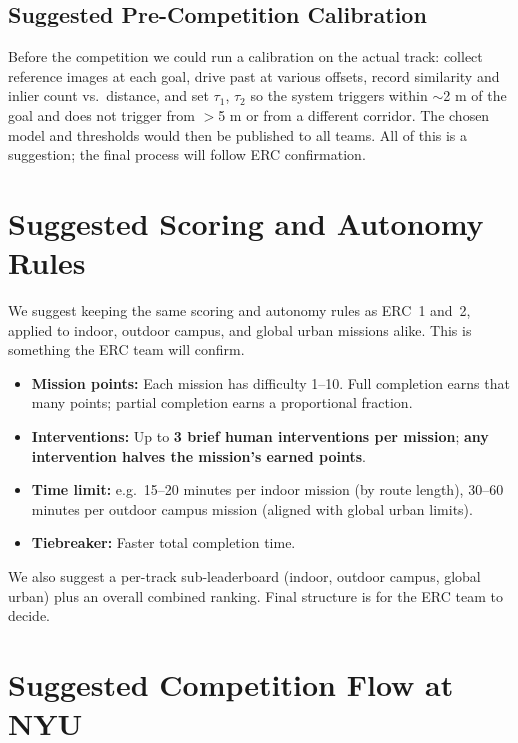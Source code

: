 \documentclass[11pt,a4paper]{article}
\begin{document}
\subsection{Suggested Pre-Competition Calibration}

Before the competition we could run a calibration on the actual track: collect reference images at each goal, drive past at various offsets, record similarity and inlier count vs.\ distance, and set $\tau_1$, $\tau_2$ so the system triggers within $\sim$2 m of the goal and does not trigger from $>$5 m or from a different corridor. The chosen model and thresholds would then be published to all teams. All of this is a suggestion; the final process will follow ERC confirmation.


\section{Suggested Scoring and Autonomy Rules}

We suggest keeping the same scoring and autonomy rules as ERC~1 and~2, applied to indoor, outdoor campus, and global urban missions alike. This is something the ERC team will confirm.

\begin{itemize}
    \item \textbf{Mission points:} Each mission has difficulty 1--10. Full completion earns that many points; partial completion earns a proportional fraction.
    \item \textbf{Interventions:} Up to \textbf{3 brief human interventions per mission}; \textbf{any intervention halves the mission's earned points}.
    \item \textbf{Time limit:} e.g.\ 15--20 minutes per indoor mission (by route length), 30--60 minutes per outdoor campus mission (aligned with global urban limits).
    \item \textbf{Tiebreaker:} Faster total completion time.
\end{itemize}

We also suggest a per-track sub-leaderboard (indoor, outdoor campus, global urban) plus an overall combined ranking. Final structure is for the ERC team to decide.


\section{Suggested Competition Flow at NYU}
\end{document}
